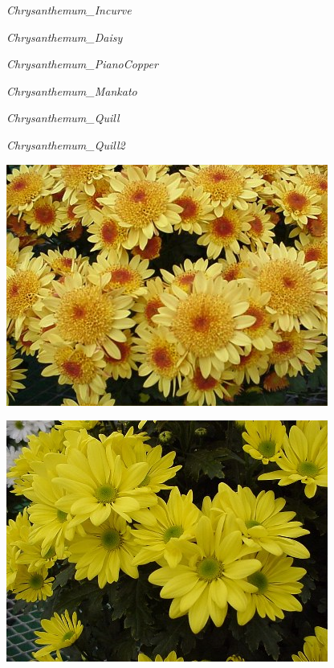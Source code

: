 \documentclass{article}
\begin{document}
\noindent   
\vfill
\centerline{{\Large\emph{Chrysanthemum_Incurve}}}
\vfill
\newpage

\noindent   
\vfill
\centerline{{\Large\emph{Chrysanthemum_Daisy}}}
\vfill
\newpage

\noindent   
\vfill
\centerline{{\Large\emph{Chrysanthemum_PianoCopper}}}
\vfill
\newpage

\noindent   
\vfill
\centerline{{\Large\emph{Chrysanthemum_Mankato}}}
\vfill
\newpage

\noindent   
\vfill
\centerline{{\Large\emph{Chrysanthemum_Quill}}}
\vfill
\newpage

\noindent   
\vfill
\centerline{{\Large\emph{Chrysanthemum_Quill2}}}
\vfill
\newpage

\begin{center}
\includegraphics[width=0.9\textheight, angle=90]{../Chrysanthemum_Anemone.jpg}
\end{center}
\newpage

\begin{center}
\includegraphics[width=0.9\textheight, angle=90]{../Chrysanthemum_Butterfield.jpg}
\end{center}
\newpage
\end{document}
